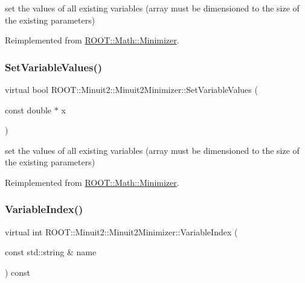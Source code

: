 set the values of all existing variables (array must be dimensioned to the size of the existing parameters) 



Reimplemented from \mbox{\hyperlink{classROOT_1_1Math_1_1Minimizer_ac8368efbd59da8e0b8bc0a0966309609}{R\+O\+O\+T\+::\+Math\+::\+Minimizer}}.

\mbox{\label{classROOT_1_1Minuit2_1_1Minuit2Minimizer_a9511e9711f3d1505556af30046c87d03}} 
\subsubsection{\texorpdfstring{SetVariableValues()}{SetVariableValues()}\hspace{0.1cm}{\footnotesize\ttfamily [3/3]}}
{\footnotesize\ttfamily virtual bool R\+O\+O\+T\+::\+Minuit2\+::\+Minuit2\+Minimizer\+::\+Set\+Variable\+Values (\begin{DoxyParamCaption}\item[{const double $\ast$}]{x }\end{DoxyParamCaption})\hspace{0.3cm}{\ttfamily [virtual]}}



set the values of all existing variables (array must be dimensioned to the size of the existing parameters) 



Reimplemented from \mbox{\hyperlink{classROOT_1_1Math_1_1Minimizer_ac8368efbd59da8e0b8bc0a0966309609}{R\+O\+O\+T\+::\+Math\+::\+Minimizer}}.

\mbox{\label{classROOT_1_1Minuit2_1_1Minuit2Minimizer_a93839e851d16fff50898af2159d8863d}} 
\subsubsection{\texorpdfstring{VariableIndex()}{VariableIndex()}\hspace{0.1cm}{\footnotesize\ttfamily [1/3]}}
{\footnotesize\ttfamily virtual int R\+O\+O\+T\+::\+Minuit2\+::\+Minuit2\+Minimizer\+::\+Variable\+Index (\begin{DoxyParamCaption}\item[{const std\+::string \&}]{name }\end{DoxyParamCaption}) const\hspace{0.3cm}{\ttfamily [virtual]}}


